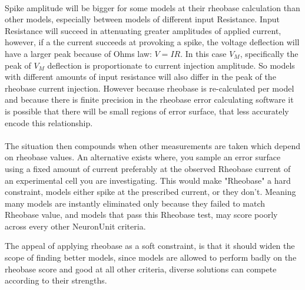     \\
    Spike amplitude will be bigger for some models at their rheobase calculation than other models, especially between models of different input Resistance. Input Resistance will succeed in attenuating greater amplitudes of applied current, however, if a the current succeeds at provoking a spike, the voltage deflection will have a larger peak because of Ohms law: $V=IR$. In this case $V_{M}$, specifically the peak of $V_{M}$ deflection is proportionate to current injection amplitude. So models with different amounts of input resistance will also differ in the peak of the rheobase current injection. However because rheobase is re-calculated per model and because there is finite precision in the rheobase error calculating software it is possible that there will be small regions of error surface, that less accurately encode this relationship.\\
    \\ 
    The situation then compounds when other measurements are taken which depend on rheobase values. An alternative exists where, you sample an error surface using a fixed amount of current preferably at the observed Rheobase current of an experimental cell you are investigating. This would make "Rheobase" a hard constraint, models either spike at the prescribed current, or they don't. Meaning many models are instantly eliminated only because they failed to match Rheobase value, and models that pass this Rheobase test, may score poorly across every other NeuronUnit criteria.
    
    The appeal of applying rheobase as a soft constraint, is that it should widen the scope of finding better models, since models are allowed to perform badly on the rheobase score and good at all other criteria, diverse solutions can compete according to their strengths.%
    
